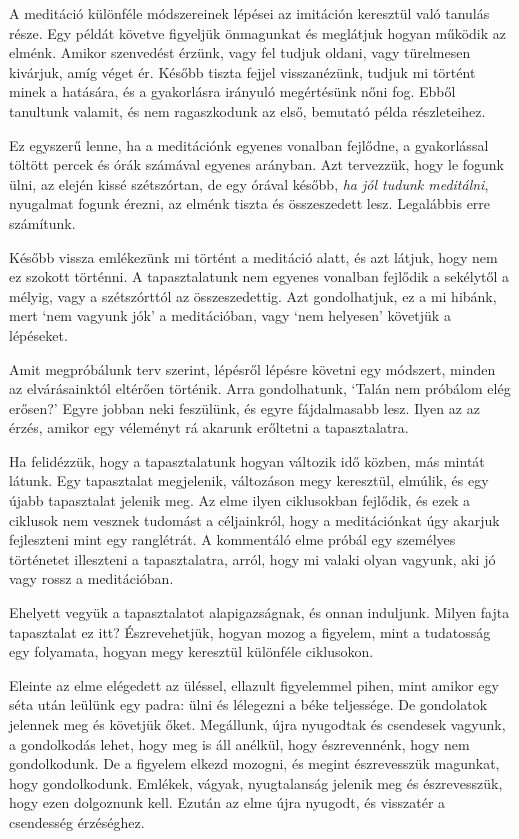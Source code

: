 A meditáció különféle módszereinek lépései az imitáción keresztül való
tanulás része. Egy példát követve figyeljük önmagunkat és meglátjuk
hogyan működik az elménk. Amikor szenvedést érzünk, vagy fel tudjuk
oldani, vagy türelmesen kivárjuk, amíg véget ér. Később tiszta fejjel
visszanézünk, tudjuk mi történt minek a hatására, és a gyakorlásra
irányuló megértésünk nőni fog. Ebből tanultunk valamit, és nem
ragaszkodunk az első, bemutató példa részleteihez.


Ez egyszerű lenne, ha a meditációnk egyenes vonalban fejlődne, a
gyakorlással töltött percek és órák számával egyenes arányban. Azt
tervezzük, hogy le fogunk ülni, az elején kissé szétszórtan, de egy
órával később, \emph{ha jól tudunk meditálni}, nyugalmat fogunk érezni,
az elménk tiszta és összeszedett lesz. Legalábbis erre számítunk.

Később vissza emlékezünk mi történt a meditáció alatt, és azt látjuk,
hogy nem ez szokott történni. A tapasztalatunk nem egyenes vonalban
fejlődik a sekélytől a mélyig, vagy a szétszórttól az összeszedettig.
Azt gondolhatjuk, ez a mi hibánk, mert `nem vagyunk jók' a meditációban,
vagy `nem helyesen' követjük a lépéseket.

Amit megpróbálunk terv szerint, lépésről lépésre követni egy módszert,
minden az elvárásainktól eltérően történik. Arra gondolhatunk, `Talán
nem próbálom elég erősen?' Egyre jobban neki feszülünk, és egyre
fájdalmasabb lesz. Ilyen az az érzés, amikor egy véleményt rá akarunk
erőltetni a tapasztalatra.

Ha felidézzük, hogy a tapasztalatunk hogyan változik idő közben, más
mintát látunk. Egy tapasztalat megjelenik, változáson megy keresztül,
elmúlik, és egy újabb tapasztalat jelenik meg. Az elme ilyen ciklusokban
fejlődik, és ezek a ciklusok nem vesznek tudomást a céljainkról, hogy a
meditációnkat úgy akarjuk fejleszteni mint egy ranglétrát. A kommentáló
elme próbál egy személyes történetet illeszteni a tapasztalatra, arról,
hogy mi valaki olyan vagyunk, aki jó vagy rossz a meditációban.

Ehelyett vegyük a tapasztalatot alapigazságnak, és onnan induljunk.
Milyen fajta tapasztalat ez itt? Észrevehetjük, hogyan mozog a figyelem,
mint a tudatosság egy folyamata, hogyan megy keresztül különféle
ciklusokon.

Eleinte az elme elégedett az üléssel, ellazult figyelemmel pihen, mint
amikor egy séta után leülünk egy padra: ülni és lélegezni a béke
teljessége. De gondolatok jelennek meg és követjük őket. Megállunk, újra
nyugodtak és csendesek vagyunk, a gondolkodás lehet, hogy meg is áll
anélkül, hogy észrevennénk, hogy nem gondolkodunk. De a figyelem elkezd
mozogni, és megint észrevesszük magunkat, hogy gondolkodunk. Emlékek,
vágyak, nyugtalanság jelenik meg és észrevesszük, hogy ezen dolgoznunk
kell. Ezután az elme újra nyugodt, és visszatér a csendesség érzéséghez.

